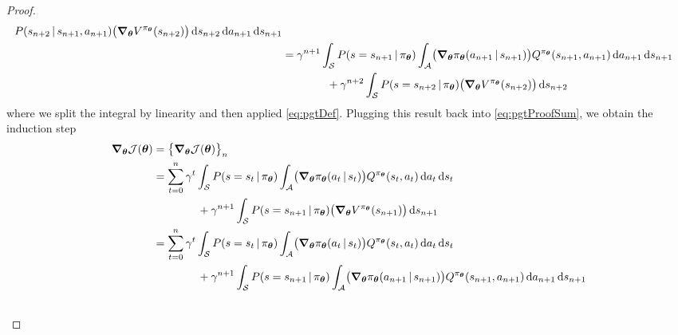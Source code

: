 \begin{proof}
\begin{align}
				P(s_{n + 2} \,\vert\, s_{n + 1}, a_{n + 1}) \bigl( \grad_{\bm{\theta}} V^{\pi_{\bm{\theta}}}(s_{n + 2}) \bigr) \dd{s_{n + 2}} \dd{a_{n + 1}} \dd{s_{n + 1}}                                                                                                    \\
				 & = \gamma^{n + 1} \int_\mathcal{S} P(s = s_{n + 1} \,\vert\, \pi_{\bm{\theta}}) \int_\mathcal{A} \bigl( \grad_{\bm{\theta}} \pi_{\bm{\theta}}(a_{n + 1} \,\vert\, s_{n + 1}) \bigr) Q^{\pi_{\bm{\theta}}}(s_{n + 1}, a_{n + 1}) \dd{a_{n + 1}} \dd{s_{n + 1}} \\&\qquad\qquad
				+ \gamma^{n + 2} \int_\mathcal{S} P(s = s_{n + 2} \,\vert\, \pi_{\bm{\theta}}) \bigl( \grad_{\bm{\theta}} V^{\pi_{\bm{\theta}}}(s_{n + 2}) \bigr) \dd{s_{n + 2}}
			\end{align}
			where we split the integral by linearity and then applied \eqref{eq:pgtDef}. Plugging this result back into \eqref{eq:pgtProofSum}, we obtain the induction step
			\begin{align}
				\grad_{\vec{\theta}} \mathcal{J}(\vec{\theta})
				 & = \bigl\{ \grad_{\vec{\theta}} \mathcal{J}(\vec{\theta}) \bigr\}_n                                                                                                                                                                                      \\
				 & = \sum_{t = 0}^{n} \gamma^t \int_{\mathcal{S}} P(s = s_t \given \pi_{\vec{\theta}}) \int_{\mathcal{A}} \bigl( \grad_{\vec{\theta}} \pi_{\vec{\theta}}(a_t \given s_t) \bigr) Q^{\pi_{\vec{\theta}}}(s_t, a_t) \dd{a_t} \dd{s_t}                         \\&\qquad\qquad
				+ \gamma^{n + 1} \int_\mathcal{S} P(s = s_{n + 1} \given \pi_{\vec{\theta}}) \bigl( \grad_{\vec{\theta}} V^{\pi_{\vec{\theta}}}(s_{n + 1}) \bigr) \dd{s_{n + 1}}                                                                                           \\
				 & = \sum_{t = 0}^{n} \gamma^t \int_{\mathcal{S}} P(s = s_t \given \pi_{\vec{\theta}}) \int_{\mathcal{A}} \bigl( \grad_{\vec{\theta}} \pi_{\vec{\theta}}(a_t \given s_t) \bigr) Q^{\pi_{\vec{\theta}}}(s_t, a_t) \dd{a_t} \dd{s_t}                         \\&\qquad\qquad
				+ \gamma^{n + 1} \int_\mathcal{S} P(s = s_{n + 1} \given \pi_{\vec{\theta}}) \int_\mathcal{A} \bigl( \grad_{\vec{\theta}} \pi_{\vec{\theta}}(a_{n + 1} \given s_{n + 1}) \bigr) Q^{\pi_{\vec{\theta}}}(s_{n + 1}, a_{n + 1}) \dd{a_{n + 1}} \dd{s_{n + 1}} \\&\qquad\qquad

\end{align}
\end{proof}
